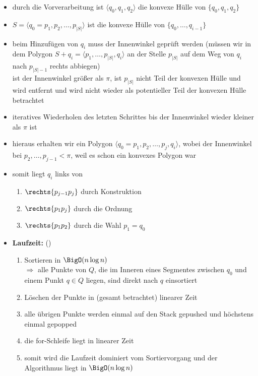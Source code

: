 \begin{itemize}[itemsep=0pt]
	\item durch die Vorverarbeitung ist $\langle q_0,q_1,q_2\rangle$ die konvexe Hülle von $\{q_0,q_1,q_2\}$
	\item $S=\langle q_0=p_1,p_2,\dots,p_{|S|}\rangle$ ist die konvexe Hülle von $\{q_0,\dots,q_{i-1}\}$
	\item beim Hinzufügen von $q_i$ muss der Innenwinkel geprüft werden (müssen wir in dem Polygon $S+q_i=\langle p_1,\dots,p_{|S|},q_i\rangle$ an der Stelle $p_{|S|}$ auf dem Weg von $q_i$ nach $p_{|S|-1}$ rechts abbiegen)\\
	ist der Innenwinkel größer als $\pi$, ist $p_{|S|}$ nicht Teil der konvexen Hülle und wird entfernt und wird nicht wieder als potentieller Teil der konvexen Hülle betrachtet
	\item iteratives Wiederholen des letzten Schrittes bis der Innenwinkel wieder kleiner als $\pi$ ist
	\item hieraus erhalten wir ein Polygon $\langle q_0=p_1,p_2,\dots,p_j,q_i\rangle$, wobei der Innenwinkel bei $p_2,\dots,p_{j-1} <\pi$, weil es schon ein konvexes Polygon war
	\item somit liegt $q_i$ links von
		\begin{enumerate}
			\item $\rechts{p_{j-1}p_j}$ durch Konstruktion
			\item $\rechts{p_{1}p_j}$ durch die Ordnung
			\item $\rechts{p_{1}p_2}$ durch die Wahl $p_1=q_0$
		\end{enumerate}
	\item \textbf{Laufzeit:} ()
		\begin{enumerate}
			\item Sortieren in $\BigO(n\log n)$\\
				$\Rightarrow$ alle Punkte von $Q$, die im Inneren eines Segmentes zwischen $q_0$ und einem Punkt $q\in Q$ liegen, sind direkt nach $q$ einsortiert
			\item Löschen der Punkte in (gesamt betrachtet) linearer Zeit
			\item alle übrigen Punkte werden einmal auf den Stack gepushed und höchstens einmal gepopped
			\item die for-Schleife liegt in linearer Zeit
			\item somit wird die Laufzeit dominiert vom Sortiervorgang und der Algorithmus liegt in $\BigO(n\log n)$
		\end{enumerate}
\end{itemize}